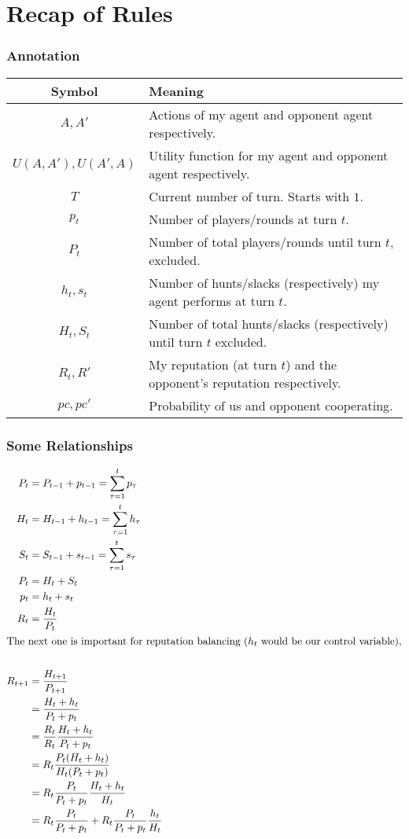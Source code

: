 \documentclass[10pt,fleqn]{article}
\begin{document}
\section{Recap of Rules}
\subsubsection{Annotation}

\begin{tabular}{|c|l|}
  \hline
  Symbol & Meaning \\
  \hline \hline
  $A, A'$ & Actions of my agent and opponent agent respectively. \\
  \hline
  $U(A, A'), U(A', A)$ & Utility function for my agent and opponent agent
  respectively. \\
  \hline
  $T$ & Current number of turn. Starts with $1$. \\
  \hline
  $p_t$ & Number of players/rounds at turn $t$. \\
  \hline
  $P_t$ & Number of total players/rounds until turn $t$, excluded. \\
  \hline
  $h_t, s_t$ & Number of hunts/slacks (respectively) my agent performs at turn
  $t$. \\
  \hline
  $H_t, S_t$ & Number of total hunts/slacks (respectively) until turn $t$
  excluded. \\
  \hline
  $R_t, R'$ & My reputation (at turn $t$) and the opponent's reputation
  respectively. \\
  \hline
  $pc, pc'$ & Probability of us and opponent cooperating. \\
  \hline
\end{tabular}

\subsubsection{Some Relationships}
\begin{align*}
  P_t &= P_{t-1} + p_{t-1} = \sum_{\tau = 1}^{t} p_\tau \\
  H_t &= H_{t-1} + h_{t-1} = \sum_{\tau = 1}^{t} h_\tau \\
  S_t &= S_{t-1} + s_{t-1} = \sum_{\tau = 1}^{t} s_\tau \\
  P_t &= H_t + S_t \\
  p_t &= h_t + s_t \\
  R_t &= \frac{H_t}{P_t} \\
  \intertext{The next one is important for reputation balancing ($h_t$ would be
  our control variable),} \\
  R_{t+1} &= \frac{H_{t+1}}{P_{t+1}} \\
          &= \frac{H_t+h_t}{P_t+p_t} \\
          &= \frac{R_t}{R_t} \frac{H_t+h_t}{P_t+p_t} \\
          &= R_t \frac{P_t (H_t+h_t)}{H_t (P_t+p_t)} \\
          &= R_t \frac{P_t}{P_t + p_t} \frac{H_t + h_t}{H_t} \\
          &= R_t \frac{P_t}{P_t + p_t} + R_t \frac{P_t}{P_t + p_t} \frac{h_t}{H_t}
\end{align*}
\end{document}
